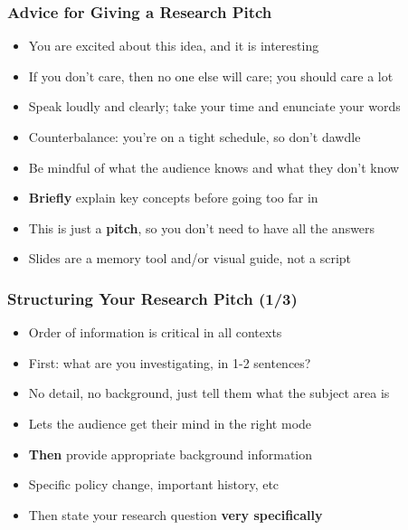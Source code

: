 \documentclass[aspectratio=169]{beamer}
\begin{document}
\begin{frame}
\frametitle{Advice for Giving a Research Pitch}

\begin{itemize}
	\item You are excited about this idea, and it is interesting
	
	\item If you don't care, then no one else will care; you should care a lot
	
	\item <2->Speak loudly and clearly; take your time and enunciate your words
	
	\item <2->Counterbalance: you're on a tight schedule, so don't dawdle
	
	\item <3->Be mindful of what the audience knows and what they don't know
	
	\item <3->\textbf{Briefly} explain key concepts before going too far in
	
	\item <4->This is just a \textbf{pitch}, so you don't need to have all the answers
	
	\item <5->Slides are a memory tool and/or visual guide, not a script
\end{itemize}
\end{frame}


\begin{frame}
\frametitle{Structuring Your Research Pitch (1/3)}

\begin{itemize}
	\item Order of information is critical in all contexts
	
	\item First: what are you investigating, in 1-2 sentences?
	
	\item <2->No detail, no background, just tell them what the subject area is
	
	\item <2->Lets the audience get their mind in the right mode
	
	\item <3->\textbf{Then} provide appropriate background information
	
	\item <3->Specific policy change, important history, etc
	
	\item <4->Then state your research question \textbf{very specifically}
\end{itemize}
\end{frame}
\end{document}
